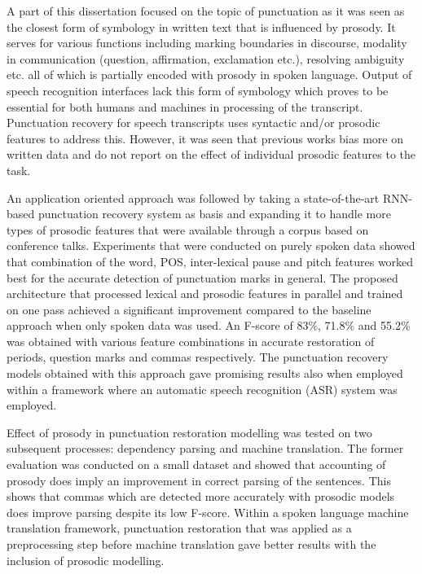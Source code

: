 A part of this dissertation focused on the topic of punctuation as it was seen as the closest form of symbology in written text that is influenced by prosody. It serves for various functions including marking boundaries in discourse, modality in communication (question, affirmation, exclamation etc.), resolving ambiguity etc. all of which is partially encoded with prosody in spoken language. Output of speech recognition interfaces lack this form of symbology which proves to be essential for both humans and machines in processing of the transcript. Punctuation recovery for speech transcripts uses syntactic and/or prosodic features to address this. However, it was seen that previous works bias more on written data and do not report on the effect of individual prosodic features to the task.

An application oriented approach was followed by taking a state-of-the-art RNN-based punctuation recovery system as basis and expanding it to handle more types of prosodic features that were available through a corpus based on conference talks. Experiments that were conducted on purely spoken data showed that combination of the word, POS, inter-lexical pause and pitch features worked best for the accurate detection of punctuation marks in general. The proposed architecture that processed lexical and prosodic features in parallel and trained on one pass achieved a significant improvement compared to the baseline approach when only spoken data was used. An F-score of 83\%, 71.8\% and 55.2\% was obtained with various feature combinations in accurate restoration of periods, question marks and commas respectively. The punctuation recovery models obtained with this approach gave promising results also when employed within a framework where an automatic speech recognition (ASR) system was employed. 

Effect of prosody in punctuation restoration modelling was tested on two subsequent processes: dependency parsing and machine translation. The former evaluation was conducted on a small dataset and showed that accounting of prosody does imply an improvement in correct parsing of the sentences. This shows that commas which are detected more accurately with prosodic models does improve parsing despite its low F-score. Within a spoken language machine translation framework, punctuation restoration that was applied as a preprocessing step before machine translation gave better results with the inclusion of prosodic modelling. 

